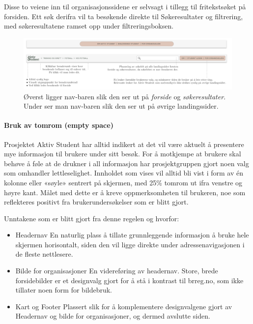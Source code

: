Disse to veiene inn til organisasjonssidene er selvsagt i tillegg til fritekstsøket på forsiden. Ett søk derifra vil ta besøkende direkte til Søkeresultater og filtrering, med søkeresultatene ramset opp under filtreringsboksen.

\begin{figure}[H]
\centering
\includegraphics[width=1\textwidth]{Illustrasjoner/nav.png}
\caption{Øverst ligger nav-baren slik den ser ut på {\em forside} og {\em søkeresultater}. Under ser man nav-baren slik den ser ut på øvrige landingssider.}
\end{figure}

\paragraph{Bruk av tomrom (empty space)}

Prosjektet Aktiv Student har alltid indikert at det vil være aktuelt å presentere mye informasjon til brukere under sitt besøk. For å motkjempe at brukere skal behøve å føle at de drukner i all informasjon har prosjektgruppen gjort noen valg som omhandler lettleselighet. Innholdet som vises vil alltid bli vist i form av én kolonne eller «søyle» sentrert på skjermen, med 25\% tomrom ut ifra venstre og høyre kant.
Målet med dette er å kreve oppmerksomheten til brukeren, noe som reflekteres positivt fra brukerundersøkelser som er blitt gjort.

\vspace{5mm}

Unntakene som er blitt gjort fra denne regelen og hvorfor:\begin{itemize}
    \item Headernav
    \newline En naturlig plass å tillate grunnleggende informasjon å bruke hele skjermen horisontalt, siden den vil ligge direkte under adressenavigasjonen i de fleste nettlesere.
    \item Bilde for organisasjoner
    \newline En videreføring av headernav. Store, brede forsidebilder er et designvalg gjort for å stå i kontrast til brreg.no, som ikke tillater noen form for bildebruk.
    \item Kart og Footer
    \newline Plassert slik for å komplementere designvalgene gjort av Headernav og bilde for organisasjoner, og dermed avslutte siden.
\end{itemize}





